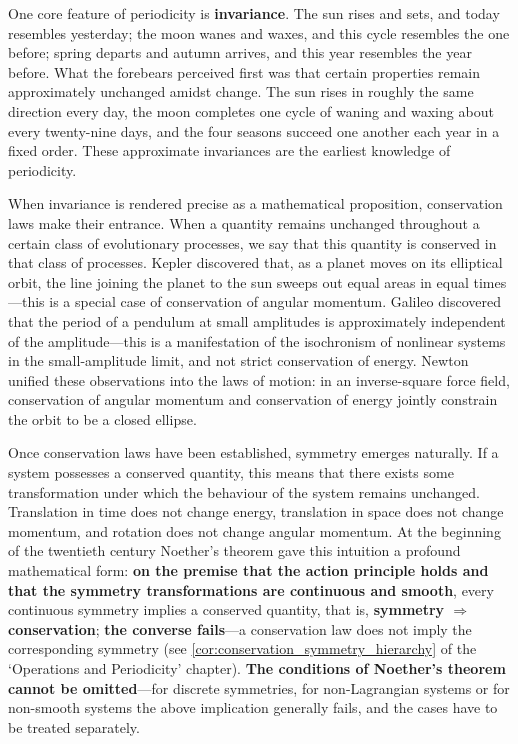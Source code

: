 One core feature of periodicity is \textbf{invariance}. The sun rises and sets, and today resembles yesterday; the moon wanes and waxes, and this cycle resembles the one before; spring departs and autumn arrives, and this year resembles the year before. What the forebears perceived first was that certain properties remain approximately unchanged amidst change. The sun rises in roughly the same direction every day, the moon completes one cycle of waning and waxing about every twenty-nine days, and the four seasons succeed one another each year in a fixed order. These approximate invariances are the earliest knowledge of periodicity.

When invariance is rendered precise as a mathematical proposition, conservation laws make their entrance. When a quantity remains unchanged throughout a certain class of evolutionary processes, we say that this quantity is conserved in that class of processes. Kepler discovered that, as a planet moves on its elliptical orbit, the line joining the planet to the sun sweeps out equal areas in equal times---this is a special case of conservation of angular momentum. Galileo discovered that the period of a pendulum at small amplitudes is approximately independent of the amplitude---this is a manifestation of the isochronism of nonlinear systems in the small-amplitude limit, and not strict conservation of energy. Newton unified these observations into the laws of motion: in an inverse-square force field, conservation of angular momentum and conservation of energy jointly constrain the orbit to be a closed ellipse.

Once conservation laws have been established, symmetry emerges naturally. If a system possesses a conserved quantity, this means that there exists some transformation under which the behaviour of the system remains unchanged. Translation in time does not change energy, translation in space does not change momentum, and rotation does not change angular momentum. At the beginning of the twentieth century Noether's theorem gave this intuition a profound mathematical form: \textbf{on the premise that the action principle holds and that the symmetry transformations are continuous and smooth}, every continuous symmetry implies a conserved quantity, that is, \textbf{symmetry $\Rightarrow$ conservation}; \textbf{the converse fails}---a conservation law does not imply the corresponding symmetry (see \cref{cor:conservation_symmetry_hierarchy} of the `Operations and Periodicity' chapter). \textbf{The conditions of Noether's theorem cannot be omitted}---for discrete symmetries, for non-Lagrangian systems or for non-smooth systems the above implication generally fails, and the cases have to be treated separately.

